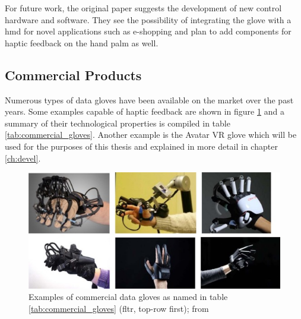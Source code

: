 \documentclass[hyperref, bachelorofscience]{cgvpub}
\begin{document}
For future work, the original paper suggests the development of new control hardware and software. They see the possibility of integrating the glove with a \acrfull{hmd} for novel applications such as e-shopping and plan to add components for haptic feedback on the hand palm as well.

\subsection{Commercial Products}
Numerous types of data gloves have been available on the market over the past years. Some examples capable of haptic feedback are shown in figure \ref{fig:commercial_gloves} and a summary of their technological properties is compiled in table \ref{tab:commercial_gloves}. Another example is the Avatar VR glove which will be used for the purposes of this thesis and explained in more detail in chapter \ref{ch:devel}.

\begin{figure}[b!]
	\includegraphics[width=\linewidth]{../pics/commercial_gloves}
	\caption{Examples of commercial data gloves as named in table \ref{tab:commercial_gloves} (fltr, top-row first); from \cite{wang19}}
	\label{fig:commercial_gloves}
\end{figure}
\end{document}
